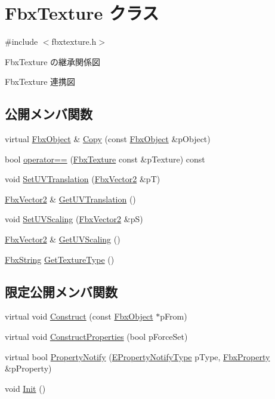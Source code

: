 \hypertarget{class_fbx_texture}{}\section{Fbx\+Texture クラス}
\label{class_fbx_texture}


{\ttfamily \#include $<$fbxtexture.\+h$>$}



Fbx\+Texture の継承関係図


Fbx\+Texture 連携図
\subsection*{公開メンバ関数}
\begin{DoxyCompactItemize}
\item 
virtual \hyperlink{class_fbx_object}{Fbx\+Object} \& \hyperlink{class_fbx_texture_a321c23c2dc2e91c58e2fcc2ed7d29f9e}{Copy} (const \hyperlink{class_fbx_object}{Fbx\+Object} \&p\+Object)
\item 
bool \hyperlink{class_fbx_texture_a65138a2a6eb3226ea7d3f0e9384c23a4}{operator==} (\hyperlink{class_fbx_texture}{Fbx\+Texture} const \&p\+Texture) const
\item 
void \hyperlink{class_fbx_texture_a25a79cb2fe825d4ab9eb85a43c8ae000}{Set\+U\+V\+Translation} (\hyperlink{class_fbx_vector2}{Fbx\+Vector2} \&pT)
\item 
\hyperlink{class_fbx_vector2}{Fbx\+Vector2} \& \hyperlink{class_fbx_texture_a091e91a0be7caf96f48a8f3fb3cb08d2}{Get\+U\+V\+Translation} ()
\item 
void \hyperlink{class_fbx_texture_ad27fe41d313171065fdeac6a111570cd}{Set\+U\+V\+Scaling} (\hyperlink{class_fbx_vector2}{Fbx\+Vector2} \&pS)
\item 
\hyperlink{class_fbx_vector2}{Fbx\+Vector2} \& \hyperlink{class_fbx_texture_a7b3d7fa85a447f0250555bb54f8d36b8}{Get\+U\+V\+Scaling} ()
\item 
\hyperlink{class_fbx_string}{Fbx\+String} \hyperlink{class_fbx_texture_ae671b7102a419f20687774bafee8058e}{Get\+Texture\+Type} ()
\end{DoxyCompactItemize}
\subsection*{限定公開メンバ関数}
\begin{DoxyCompactItemize}
\item 
virtual void \hyperlink{class_fbx_texture_afc81141345bc807a77dcbd9d6a0d8356}{Construct} (const \hyperlink{class_fbx_object}{Fbx\+Object} $\ast$p\+From)
\item 
virtual void \hyperlink{class_fbx_texture_a851d5c4c96fb5023c004c88aeab2275b}{Construct\+Properties} (bool p\+Force\+Set)
\item 
virtual bool \hyperlink{class_fbx_texture_af45140c7eecc9b2e133d7ee8a63fd5f5}{Property\+Notify} (\hyperlink{class_fbx_object_a528f1b2c2b7abbd64c525ba3a9a496b8}{E\+Property\+Notify\+Type} p\+Type, \hyperlink{class_fbx_property}{Fbx\+Property} \&p\+Property)
\item 
void \hyperlink{class_fbx_texture_a2e0e1f9bca241abf56d471168a93c5fc}{Init} ()
\end{DoxyCompactItemize}
